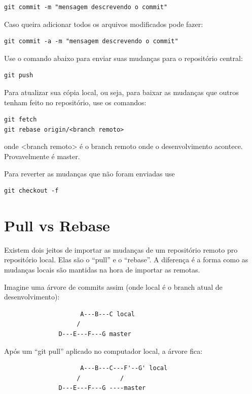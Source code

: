 \documentclass[12pt,brazil]{book}
\begin{document}
\begin{verbatim}
git commit -m "mensagem descrevendo o commit"
\end{verbatim}

Caso queira adicionar todos os arquivos modificados pode fazer:

\begin{verbatim}
git commit -a -m "mensagem descrevendo o commit"
\end{verbatim}

Use o comando abaixo para enviar suas mudanças para o repositório
central:

\begin{verbatim}
git push
\end{verbatim}

Para atualizar sua cópia local, ou seja, para baixar as mudanças que
outros tenham feito no repositório, use os comandos:

\begin{verbatim}
git fetch
git rebase origin/<branch remoto>
\end{verbatim}

onde <branch remoto> é o branch remoto onde o desenvolvimento
acontece. Provavelmente é master.

Para reverter as mudanças que não foram enviadas use

\begin{verbatim}
git checkout -f
\end{verbatim}


\section{Pull vs Rebase}

Existem dois jeitos de importar as mudanças de um repositório remoto
pro repositório local. Elas são o ``pull'' e o ``rebase''. A diferença
é a forma como as mudanças locais são mantidas na hora de importar as
remotas.

Imagine uma árvore de commits assim (onde local é o branch atual de desenvolvimento):

\begin{verbatim}
                     A---B---C local
                    /
               D---E---F---G master
\end{verbatim}

Após um ``git pull'' aplicado no computador local, a árvore fica:

\begin{verbatim}
                     A---B---C---F'--G' local
                    /           /
               D---E---F---G ----master
\end{verbatim}
\end{document}
